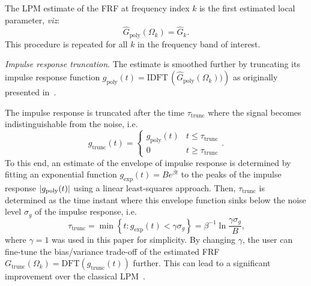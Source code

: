 \begin{enumerate}
  The \gls{LPM} estimate of the \gls{FRF} at frequency index $k$ is the first estimated local parameter, \emph{viz}:
\begin{equation}
\hat{G}_\text{poly}(\Omega_k) = \hat{G}_k
\text{.}
\end{equation}
This procedure is repeated for all $k$ in the frequency band of interest.


\emph{Impulse response truncation}. 
The estimate is smoothed further by truncating its impulse response function $g_{\text{poly}}(t) = \mathrm{IDFT}\, \left( \hat{G}_\text{poly}(\Omega_k)) \right)$ as originally presented in~\citep{Lumori2014TIM}.

The impulse response is truncated after the time $\tau_{\mathrm{trunc}}$ where the signal becomes indistinguishable from the noise, i.e.
\begin{equation}
  g_{\mathrm{trunc}}(t) = 
  \begin{cases}
    g_{\text{poly}}(t) & t \leq \tau_{\mathrm{trunc}} \\
    0                    & t \geq \tau_{\mathrm{trunc}}
  \end{cases}
  \text{.}
\end{equation}
To this end, an estimate of the envelope of impulse response is determined by fitting an exponential function $g_{\mathrm{exp}}(t) = B e^{\beta t}$ to the peaks of the impulse response $\left| g_{\mathrm{poly}}(t) \right|$ using a linear least-squares approach.
Then, $\tau_{\mathrm{trunc}}$ is determined as the time instant where this envelope function sinks below the noise level $\sigma_g$ of the impulse response, i.e. 
\begin{equation}
  \tau_{\mathrm{trunc}} = \min \left\{  t :  g_{\mathrm{exp}}(t) < \gamma \sigma_g \right\}
  = \beta^{-1} \ln \frac{\gamma \sigma_g}{B}
  \text{,}
\end{equation}
where $\gamma=1$ was used in this paper for simplicity.
By changing $\gamma$, the user can fine-tune the bias/variance trade-off of the estimated FRF $G_{\mathrm{trunc}}(\Omega_k) = \mathrm{DFT} \left( g_{\mathrm{trunc}}(t)\right)$ further.
This can lead to a significant improvement over the classical LPM~\citep{Lumori2014TIM}.
 

\end{enumerate}
